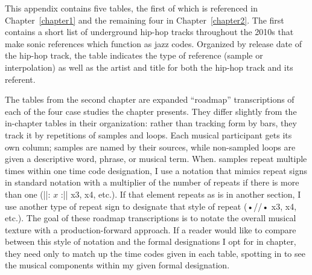 \onehalfspacing
\appendix \label{appendix:fullroadmaps}
\renewcommand{\thetable}{A.\arabic{table}}
\setcounter{table}{0}

This appendix contains five tables, the first of which is referenced in Chapter~\ref{chapter1} and
the remaining four in Chapter~\ref{chapter2}. The first contains a short list of underground hip-hop
tracks throughout the 2010s that make sonic references which function as jazz codes. Organized by
release date of the hip-hop track, the table indicates the type of reference (sample or interpolation)
as well as the artist and title for both the hip-hop track and its referent.

The tables from the second chapter are expanded ``roadmap'' transcriptions of each of the four case
studies the chapter presents. They differ slightly from the in-chapter tables in their organization:
rather than tracking form by bars, they track it by repetitions of samples and loops. Each musical
participant gets its own column; samples are named by their sources, while non-sampled loops are
given a descriptive word, phrase, or musical term. When. samples repeat multiple times within one
time code designation, I use a notation that mimics repeat signs in standard notation with a multiplier
of the number of repeats if there is more than one (||: $x$ :|| x3, x4, etc.). If that element repeats
as is in another section, I use another type of repeat sign to designate that style of repeat (•//• x3,
x4, etc.). The goal of these roadmap transcriptions is to notate the overall musical texture with a
production-forward approach. If a reader would like to compare between this style of notation and the
formal designations I opt for in chapter, they need only to match up the time codes given in each
table, spotting in to see the musical components within my given formal designation.

